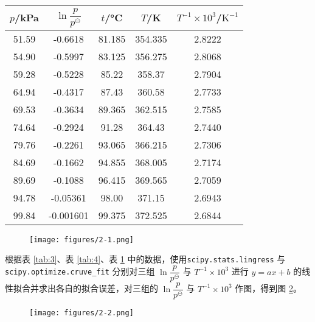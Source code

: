 \begin{table}[htbp]
    \centering
    \begin{tabular}{ccccc}
        \toprule
        $p$/\si{kPa} & $\ln\dfrac{p}{p^\ominus}$ & $t$/\si{\celsius} & $T$/\si{K} & $T^{-1}\times10^{3} $/$\mathrm{K^{-1}}$ \\
        \midrule
        51.59 & -0.6618 & 81.185 & 354.335 & 2.8222 \\
        54.90 & -0.5997 & 83.125 & 356.275 & 2.8068 \\
        59.28 & -0.5228 & 85.22 & 358.37 & 2.7904 \\
        64.94 & -0.4317 & 87.43 & 360.58 & 2.7733 \\
        69.53 & -0.3634 & 89.365 & 362.515 & 2.7585 \\
        74.64 & -0.2924 & 91.28 & 364.43 & 2.7440 \\
        79.76 & -0.2261 & 93.065 & 366.215 & 2.7306 \\
        84.69 & -0.1662 & 94.855 & 368.005 & 2.7174 \\
        89.69 & -0.1088 & 96.415 & 369.565 & 2.7059 \\
        94.78 & -0.05361 & 98.00 & 371.15 & 2.6943 \\
        99.84 & -0.001601 & 99.375 & 372.525 & 2.6844 \\
        \bottomrule
        \end{tabular}
    \label{tab:5}
\end{table}

\begin{figure}[htbp]
    \centering
    \texttt{[image: figures/2-1.png]}
    \label{fig:3}
\end{figure}

根据表 \ref{tab:3}、表 \ref{tab:4}、表 \ref{tab:5} 中的数据，使用\texttt{scipy.stats.lingress} 与 \texttt{scipy.optimize.cruve\_fit} 分别对三组 \(\ln \dfrac{p}{p^\ominus}\) 与 \(T^{-1}\times10^{3}\) 进行 $y=ax+b$ 的线性拟合并求出各自的拟合误差，对三组的 \(\ln \dfrac{p}{p^\ominus}\) 与 \(T^{-1}\times10^{3}\) 作图，得到图 \ref{fig:4}。

\begin{figure}[htbp]
    \centering
    \texttt{[image: figures/2-2.png]}
    \label{fig:4}
\end{figure}

